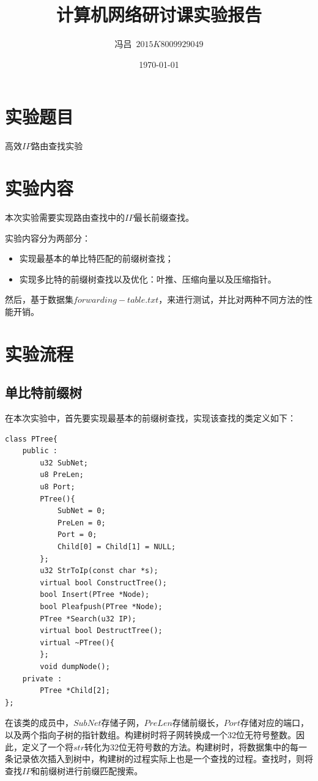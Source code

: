 \documentclass[UTF8,noindent]{ctexart}
\title{\CJKfamily{zhkai}计算机网络研讨课实验报告}
\author{{\CJKfamily{zhkai}冯吕}\ $2015K8009929049$}
\date{\today}
\begin{document}
\maketitle
{}
\section*{{实验题目}}高效$IP$路由查找实验
\section*{{实验内容}}
本次实验需要实现路由查找中的$IP$最长前缀查找。

实验内容分为两部分：
\begin{itemize}
  \item 实现最基本的单比特匹配的前缀树查找；
	\item 实现多比特的前缀树查找以及优化：叶推、压缩向量以及压缩指针。
\end{itemize}

然后，基于数据集$forwarding-table.txt$，来进行测试，并比对两种不同方法的性能开销。
\section*{{实验流程}}
\subsection*{单比特前缀树}
在本次实验中，首先要实现最基本的前缀树查找，实现该查找的类定义如下：
\begin{lstlisting}
class PTree{
	public :
		u32 SubNet;
		u8 PreLen;
		u8 Port;
		PTree(){
			SubNet = 0;
			PreLen = 0;
			Port = 0;
			Child[0] = Child[1] = NULL;
		};
		u32 StrToIp(const char *s);
		virtual bool ConstructTree();
		bool Insert(PTree *Node);
		bool Pleafpush(PTree *Node);
		PTree *Search(u32 IP);
		virtual bool DestructTree();
		virtual ~PTree(){
		};
		void dumpNode();
	private :
		PTree *Child[2];
};
\end{lstlisting}

在该类的成员中，$SubNet$存储子网，$PreLen$存储前缀长，$Port$存储对应的端口，以及两个指向子树的指针数组。构建树时将子网转换成一个$32$位无符号整数。因此，定义了一个将$str$转化为$32$位无符号数的方法。构建树时，将数据集中的每一条记录依次插入到树中，构建树的过程实际上也是一个查找的过程。查找时，则将查找$IP$和前缀树进行前缀匹配搜索。
\end{document}
